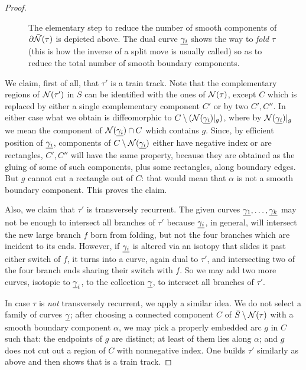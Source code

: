 \begin{proof}
\begin{figure}
\begin{center}
\def\svgwidth{.9\textwidth}

\end{center}
\caption{\label{fig:cornerization}The elementary step to reduce the number of smooth components of $\partial\bar{{\mathcal N}}(\tau)$ is depicted above. The dual curve $\underline{\gamma_i}$ shows the way to \emph{fold} $\tau$ (this is how the inverse of a split move is usually called) so as to reduce the total number of smooth boundary components.}
\end{figure}

We claim, first of all, that $\tau'$ is a train track. Note that the complementary regions of ${\mathcal N}(\tau')$ in $S$ can be identified with the ones of ${\mathcal N}(\tau)$, except $C$ which is replaced by either a single complementary component $C'$ or by two $C',C''$. In either case what we obtain is diffeomorphic to $C\setminus ({\mathcal N}(\underline{\gamma_i})|_g)$, where by ${\mathcal N}(\underline{\gamma_i})|_g$ we mean the component of ${\mathcal N}(\underline{\gamma_i})\cap C$ which contains $g$. Since, by efficient position of $\underline{\gamma_i}$, components of $C\setminus{\mathcal N}(\underline{\gamma_i})$ either have negative index or are rectangles, $C',C''$ will have the same property, because they are obtained as the gluing of some of such components, plus some rectangles, along boundary edges. But $g$ cannot cut a rectangle out of $C$: that would mean that $\alpha$ is not a smooth boundary component. This proves the claim.

Also, we claim that $\tau'$ is transversely recurrent. The given curves $\underline{\gamma_1},\ldots,\underline{\gamma_k}$ may not be enough to intersect all branches of $\tau'$ because $\underline{\gamma_i}$, in general, will intersect the new large branch $f$ born from folding, but not the four branches which are incident to its ends. However, if $\underline{\gamma_i}$ is altered via an isotopy that slides it past either switch of $f$, it turns into a curve, again dual to $\tau'$, and intersecting two of the four branch ends sharing their switch with $f$. So we may add two more curves, isotopic to $\underline{\gamma}_i$, to the collection $\underline{\gamma}$, to intersect all branches of $\tau'$.

In case $\tau$ is \emph{not} transversely recurrent, we apply a similar idea. We do not select a family of curves $\underline{\gamma}$; after choosing a connected component $C$ of $\bar S\setminus{\mathcal N}(\tau)$ with a smooth boundary component $\alpha$, we may pick a properly embedded arc $g$ in $C$ such that: the endpoints of $g$ are distinct; at least of them lies along $\alpha$; and $g$ does not cut out a region of $C$ with nonnegative index. One builds $\tau'$ similarly as above and then shows that is a train track.
\end{proof}

